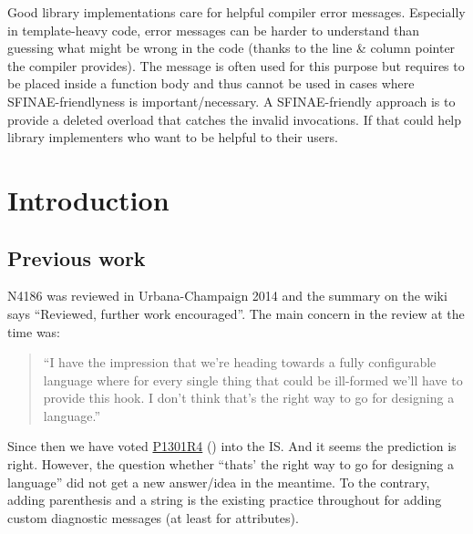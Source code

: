 \newcommand\wgTitle{\texttt{= delete} should have a reason}
\newcommand\wgName{Matthias Kretz <m.kretz@gsi.de>, Augustin?, LWG ?}
\newcommand\wgDocumentNumber{DXXXXR0}
\newcommand\wgPreviousDocumentNumber{N4186}
\newcommand\wgGroup{EWG-I}
\newcommand\wgTarget{\CC{}23}

\usepackage{mymacros}
\usepackage{wg21}
\usepackage{changelog}
\usepackage{underscore}

\newcommand\wglink[1]{\href{https://wg21.link/#1}{#1}}


\begin{wgTitlepage}
  Good library implementations care for helpful compiler error messages.
  Especially in template-heavy code, error messages can be harder to understand than guessing what might be wrong in the code (thanks to the line \& column pointer the compiler provides).
  The  message is often used for this purpose but requires to be placed inside a function body and thus cannot be used in cases where SFINAE-friendlyness is important/necessary.
  A SFINAE-friendly approach is to provide a deleted overload that catches the invalid invocations.
  If  that could help library implementers who want to be helpful to their users.
\end{wgTitlepage}

\pagestyle{scrheadings}




\section{Introduction}

\subsection{Previous work}
N4186 was reviewed in Urbana-Champaign 2014 and the summary on the wiki says “Reviewed, further work encouraged”.
The main concern in the review at the time was:
\begin{quote}{}
“I have the impression that we're heading towards a fully configurable language where for every single thing that could be ill-formed we'll have to provide this hook.
I don't think that's the right way to go for designing a language.”
\end{quote}
Since then we have voted \wglink{P1301R4} () into the IS.
And it seems the prediction is right.
However, the question whether “thats' the right way to go for designing a language” did not get a new answer/idea in the meantime.
To the contrary, adding parenthesis and a string is the existing practice throughout \CC{} for adding custom diagnostic messages (at least for attributes).

